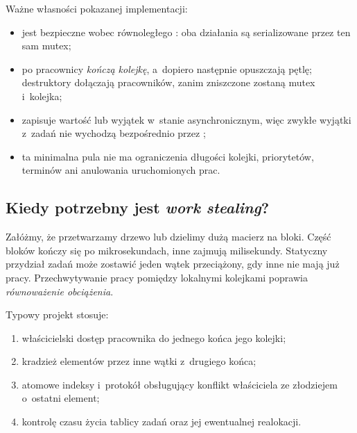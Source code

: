 Ważne własności pokazanej implementacji:
\begin{itemize}
\item {} jest bezpieczne wobec równoległego :
      oba działania są serializowane przez ten sam mutex;
\item po  pracownicy \emph{kończą kolejkę}, a~dopiero
      następnie opuszczają pętlę; destruktory  dołączają
      pracowników, zanim zniszczone zostaną mutex i~kolejka;
\item {} zapisuje wartość lub wyjątek w~stanie
      asynchronicznym, więc zwykłe wyjątki z~zadań nie wychodzą
      bezpośrednio przez ;
\item ta minimalna pula nie ma ograniczenia długości kolejki,
      priorytetów, terminów ani anulowania uruchomionych prac.
\end{itemize}


\subsection{Kiedy potrzebny jest \emph{work stealing}?}

Załóżmy, że przetwarzamy drzewo lub dzielimy dużą macierz na bloki.
Część bloków kończy się po mikrosekundach, inne zajmują milisekundy.
Statyczny przydział zadań może zostawić jeden wątek przeciążony,
gdy inne nie mają już pracy. Przechwytywanie pracy pomiędzy lokalnymi
kolejkami poprawia \emph{równoważenie obciążenia}.

Typowy projekt stosuje:
\begin{enumerate}
\item właścicielski dostęp pracownika do jednego końca jego kolejki;
\item kradzież elementów przez inne wątki z~drugiego końca;
\item atomowe indeksy i~protokół obsługujący konflikt właściciela
      ze złodziejem o~ostatni element;
\item kontrolę czasu życia tablicy zadań oraz jej ewentualnej realokacji.
\end{enumerate}

